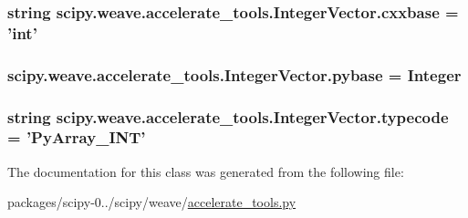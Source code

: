 \subsubsection[{cxxbase}]{\setlength{\rightskip}{0pt plus 5cm}string scipy.\+weave.\+accelerate\+\_\+tools.\+Integer\+Vector.\+cxxbase = 'int'\hspace{0.3cm}{\ttfamily [static]}}\label{classscipy_1_1weave_1_1accelerate__tools_1_1IntegerVector_a309f3b54126ad8e0fe1a1d5ffb43df6c}
\hypertarget{classscipy_1_1weave_1_1accelerate__tools_1_1IntegerVector_affa300b578d5f1c43be0594868b827dc}{}
\subsubsection[{pybase}]{\setlength{\rightskip}{0pt plus 5cm}scipy.\+weave.\+accelerate\+\_\+tools.\+Integer\+Vector.\+pybase = {\bf Integer}\hspace{0.3cm}{\ttfamily [static]}}\label{classscipy_1_1weave_1_1accelerate__tools_1_1IntegerVector_affa300b578d5f1c43be0594868b827dc}
\hypertarget{classscipy_1_1weave_1_1accelerate__tools_1_1IntegerVector_a779c730be21616fcdeb5589f60d7351f}{}
\subsubsection[{typecode}]{\setlength{\rightskip}{0pt plus 5cm}string scipy.\+weave.\+accelerate\+\_\+tools.\+Integer\+Vector.\+typecode = 'Py\+Array\+\_\+\+I\+N\+T'\hspace{0.3cm}{\ttfamily [static]}}\label{classscipy_1_1weave_1_1accelerate__tools_1_1IntegerVector_a779c730be21616fcdeb5589f60d7351f}


The documentation for this class was generated from the following file\+:\begin{DoxyCompactItemize}
\item 
packages/scipy-\/0../scipy/weave/\hyperlink{accelerate__tools_8py}{accelerate\+\_\+tools.\+py}\end{DoxyCompactItemize}
